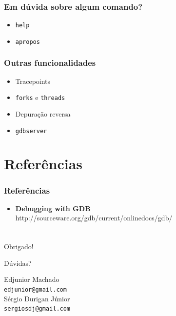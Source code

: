 \documentclass[xcolor=pdftex,dvipsnames,table,t]{beamer}
\begin{document}
\begin{frame}
	\frametitle{Em dúvida sobre algum comando?}
	  \begin{itemize}
	    \item \texttt{help}
	    \item \texttt{apropos}
	  \end{itemize}
\end{frame}

\begin{frame}
	\frametitle{Outras funcionalidades}
	  \begin{itemize}
	    \item Tracepoints
	    \item \texttt{forks} e \texttt{threads}
	    \item Depuração reversa
	    \item \texttt{gdbserver}
	  \end{itemize}
\end{frame}

\section{Referências}
\begin{frame}
       \frametitle{Referências}
        \begin{center}
        \begin{itemize}
		\item \textbf{Debugging with GDB} \\
		http://sourceware.org/gdb/current/onlinedocs/gdb/
	\end{itemize}
        \end{center}
\end{frame}

\section{}
\begin{frame}
	\begin{center}
	\LARGE
	\alert{Obrigado!}

	Dúvidas?


	\vspace{2\baselineskip}

	\small
	Edjunior Machado \\
	{\tt edjunior@gmail.com} \\
	\vspace{1\baselineskip}
	Sérgio Durigan Júnior \\
	{\tt sergiosdj@gmail.com}
	\end{center}
\end{frame}
\end{document}
